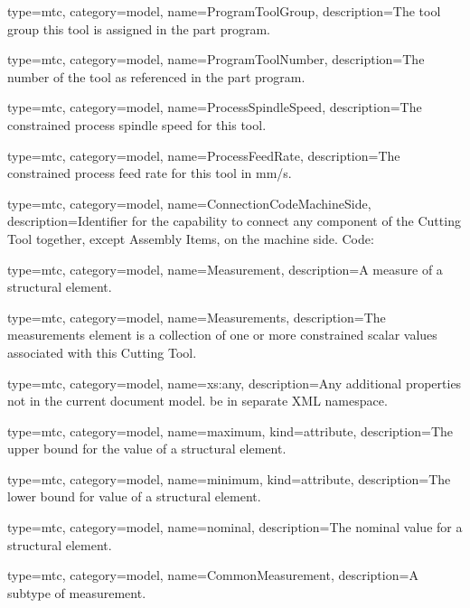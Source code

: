 {
  type=mtc,
  category=model,
  name={ProgramToolGroup},
  description={The tool group this tool is assigned in the part program.}
}


{
  type=mtc,
  category=model,
  name={ProgramToolNumber},
  description={The number of the tool as referenced in the part program.}
}


{
  type=mtc,
  category=model,
  name={ProcessSpindleSpeed},
  description={The constrained process spindle speed for this tool.}
}


{
  type=mtc,
  category=model,
  name={ProcessFeedRate},
  description={The constrained process feed rate for this tool in mm/s.}
}


{
  type=mtc,
  category=model,
  name={ConnectionCodeMachineSide},
  description={Identifier for the capability to connect any component of the Cutting Tool together, except Assembly Items, on the machine side. Code: }
}


{
  type=mtc,
  category=model,
  name={Measurement},
  description={A measure of a \gls{structural element}.}
}

{
  type=mtc,
  category=model,
  name={Measurements},
  description={The \gls{measurements} element is a collection of one or more constrained scalar values associated with this Cutting Tool.}
}


{
  type=mtc,
  category=model,
  name={xs:any},
  description={Any additional properties not in the current document model. \MUST be in separate XML namespace.}
}


{
  type=mtc,
  category=model,
  name={maximum},
  kind={attribute},
  description={The upper bound for the value of a \gls{structural element}.}
}


{
  type=mtc,
  category=model,
  name={minimum},
  kind={attribute},
  description={The lower bound for value of a \gls{structural element}.}
}


{
  type=mtc,
  category=model,
  name={nominal},
  description={The nominal value for a \gls{structural element}.}
}




{
  type=mtc,
  category=model,
  name={CommonMeasurement},
  description={A subtype of \gls{measurement}.}
}


